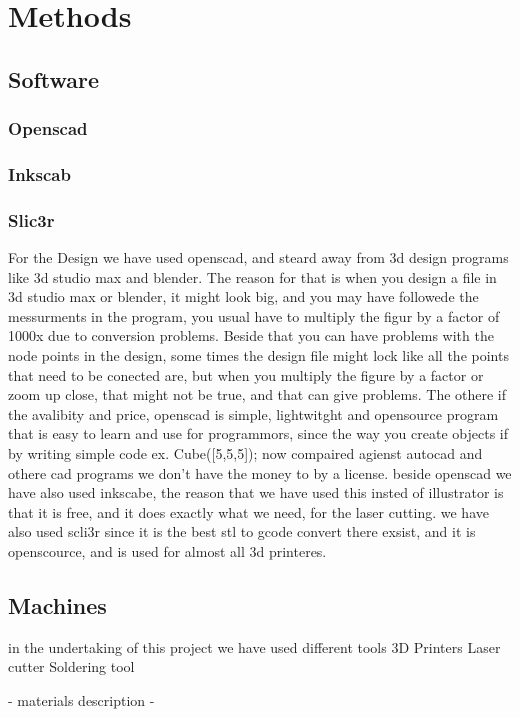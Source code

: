 \section{Methods}
\subsection{Software}
\subsubsection{Openscad}
\subsubsection{Inkscab}
\subsubsection{Slic3r}
For the Design we have used openscad, and steard away from 3d design programs like 3d studio max and blender.
The reason for that is when you design a file in 3d studio max or blender, it might look big, and you may have followede the messurments in the program, you usual have to multiply the figur by a factor of 1000x due to conversion problems. Beside that you can have problems with the node points in the design, some times the design file might lock like all the points that need to be conected are, but when you multiply the figure by a factor or zoom up close, that might not be true, and that can give problems.
The othere if the avalibity and price, openscad is simple, lightwitght and opensource program that is easy to learn and use for programmors, since the way you create objects if by writing simple code ex. Cube([5,5,5]); now compaired agienst autocad and othere cad programs we don't have the money to by a license.
beside openscad we have also used inkscabe, the reason that we have used this insted of illustrator is that it is free, and it does exactly what we need, for the laser cutting.
we have also used scli3r since it is the best stl to gcode convert there exsist, and it is openscource, and is used for almost all 3d printeres.

\subsection{Machines}
in the undertaking of this project we have used different tools
3D Printers
Laser cutter
Soldering tool

- materials description
- 